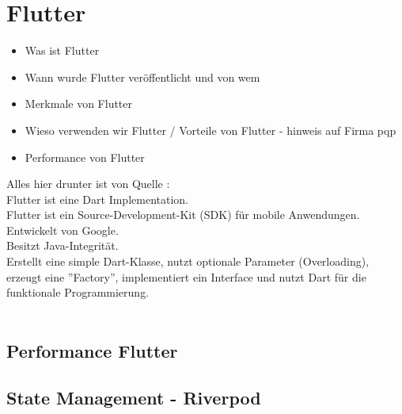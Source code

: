 \section{Flutter}
\label{sec:Grundlagen:Flutter}

\begin{itemize}
    \item Was ist Flutter
    \item Wann wurde Flutter veröffentlicht und von wem
    \item Merkmale von Flutter
    \item Wieso verwenden wir Flutter / Vorteile von Flutter - hinweis auf Firma pqp
    \item Performance von Flutter
\end{itemize}

Alles hier drunter ist von Quelle \cite{article:Dart:JavaAndDart_AfafMirghaniHassan}:
\\Flutter ist eine Dart Implementation.
\\Flutter ist ein Source-Development-Kit (SDK) für mobile Anwendungen.
\\Entwickelt von Google.
\\Besitzt Java-Integrität.
\\Erstellt eine simple Dart-Klasse, nutzt optionale Parameter (Overloading), erzeugt eine ''Factory'', implementiert ein Interface und nutzt Dart für die funktionale Programmierung.
\\
\\

\subsection{Performance Flutter}
\subsection{State Management - Riverpod}
